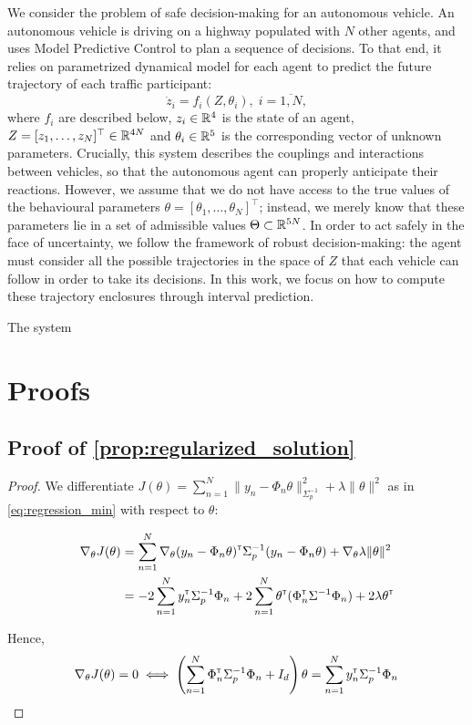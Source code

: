 \documentclass{article}
\begin{document}
We consider the problem of safe decision-making for an autonomous vehicle. An autonomous vehicle is driving on a highway populated with $N$ other agents, and uses Model Predictive Control to plan a sequence of decisions. To that end, it relies on parametrized dynamical model for each agent to predict the future trajectory of each traffic participant: \[\dot{z}_i=f_i(Z,\theta_i),\;i=\overline{1,N},\] where $f_i$ are described below, $z_i\in\mathbb{R}^4$ is the state of an agent, $Z = [z_1,\dots,z_N]^\top\in\mathbb{R}^{4N}$ and $\theta_i\in\mathbb{R}^5$ is the corresponding vector of unknown parameters. Crucially, this system describes the couplings and interactions between vehicles, so that the autonomous agent can properly anticipate their reactions. 
However, we assume that we do not have access to the true values of the behavioural parameters $\theta=[\theta_1,\dots,\theta_N]^\top$; instead, we merely know that these parameters lie in a set of admissible values $\Theta\subset\mathbb{R}^{5N}$. In order to act safely in the face of uncertainty, we follow the framework of robust decision-making: the agent must consider all the possible trajectories in the space of $Z$ that each vehicle can follow in order to take its decisions. In this work, we focus on how to compute these trajectory enclosures through interval prediction.

The system 





\clearpage
\appendix

\section{Proofs}

\subsection{Proof of \autoref{prop:regularized_solution}}

\begin{proof}
We differentiate $J(\theta) = \sum_{n=1}^N \|y_n -\Phi_n\theta\|_{\Sigma_p^{-1}}^2 + \lambda\|\theta\|_{}^2$ as in  \eqref{eq:regression_min} with respect to $\theta$:

\begin{align*}
    \nabla_{\theta} J(\theta) &= \sum_{n=1}^N\nabla_{\theta} (y_n - \Phi_n\theta)^{\mathsf{\scriptscriptstyle T}}\Sigma_p^{-1}(y_n - \Phi_n\theta) + \nabla_{\theta} \lambda\|\theta\|_{}^2\\
    &= -2\sum_{n=1}^N y_n^{\mathsf{\scriptscriptstyle T}}\Sigma_p^{-1}\Phi_n + 2\sum_{n=1}^N\theta^{\mathsf{\scriptscriptstyle T}}(\Phi_n^{\mathsf{\scriptscriptstyle T}}\Sigma^{-1}\Phi_n) +  2 \lambda \theta^{\mathsf{\scriptscriptstyle T}}
\end{align*}

Hence,
\begin{align*}
    \nabla_{\theta} J(\theta) = 0 \iff \left(\sum_{n=1}^N\Phi_n^{\mathsf{\scriptscriptstyle T}}\Sigma_p^{-1}\Phi_n + I_d\right)\theta = \sum_{n=1}^N y_n^{\mathsf{\scriptscriptstyle T}}\Sigma_p^{-1}\Phi_n
\end{align*}
\end{proof}
\end{document}
